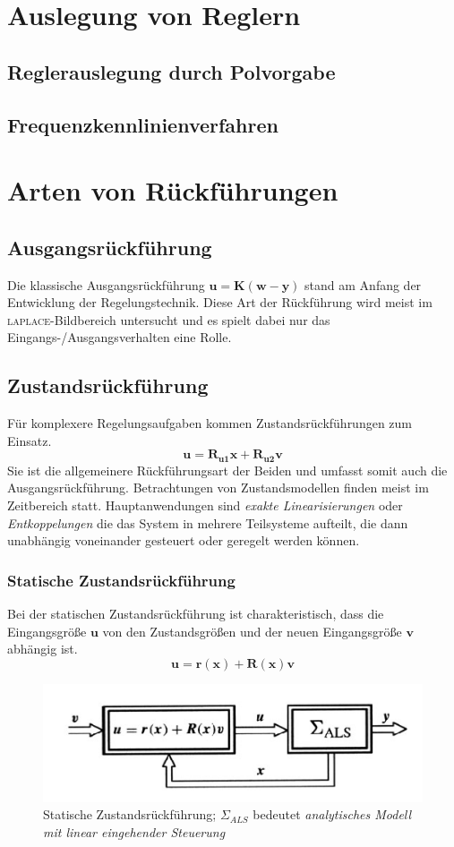 \section{Auslegung von Reglern}
	\subsection{Reglerauslegung durch Polvorgabe}
	\subsection{Frequenzkennlinienverfahren}

\section{Arten von Rückführungen}
	\subsection{Ausgangsrückführung}
		Die klassische Ausgangsrückführung $ \bm{u}=\bm{K(w-y)} $ stand am Anfang der Entwicklung der Regelungstechnik. Diese Art der Rückführung wird meist im \textsc{laplace}-Bildbereich untersucht und es spielt dabei nur das Eingangs-/Ausgangsverhalten eine Rolle.
	\subsection{Zustandsrückführung}
		Für komplexere Regelungsaufgaben kommen Zustandsrückführungen zum Einsatz.
		\[\bm{u}=\bm{R_{u1}x}+\bm{R_{u2}v}\]
		Sie ist die allgemeinere Rückführungsart der Beiden und umfasst somit auch die Ausgangsrückführung. Betrachtungen von Zustandsmodellen finden meist im Zeitbereich statt. Hauptanwendungen sind \textit{exakte Linearisierungen} oder \textit{Entkoppelungen} die das System in mehrere Teilsysteme aufteilt, die dann unabhängig voneinander gesteuert oder geregelt werden können.
		\subsubsection{Statische Zustandsrückführung}
			Bei der statischen Zustandsrückführung ist charakteristisch, dass die Eingangsgröße $ \bm{u} $ von den Zustandsgrößen und der neuen Eingangsgröße $ \bm{v} $ abhängig ist.
			\[\bm{u}=\bm{r(x)}+\bm{R(x)v}\]
			\begin{figure}[h]
				\centering
				\includegraphics[width=0.6\linewidth]{./pics/re/stat}
				\caption{Statische Zustandsrückführung; $ \Sigma_{ALS} $ bedeutet \textit{analytisches Modell mit linear eingehender Steuerung}}
			\end{figure}
